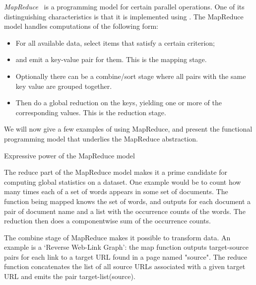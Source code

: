 
\emph{MapReduce}~\cite{Google:mapreduce} is a
programming model for certain parallel operations. One of its
distinguishing characteristics is that it is implemented using
.  The MapReduce model handles
computations of the following form:
\begin{itemize}
\item For all available data, select items that satisfy a certain
  criterion;
\item and emit a key-value pair for them. This is the mapping stage.
\item Optionally there can be a combine/sort stage where all pairs with the
  same key value are grouped together.
\item Then do a global reduction on the keys, yielding one or more of
  the corresponding values. This is the reduction stage.
\end{itemize}

We will now give a few examples of using MapReduce, and present the
functional programming model that underlies the MapReduce abstraction.

 {Expressive power of the MapReduce model}
 
The reduce part of the MapReduce model makes it a prime candidate for
computing global statistics on a dataset.
One example would be to count how many times each of a set of words
appears in some set of documents. The function being mapped knows the
set of words, and outputs for each document a pair of document name
and a list with the occurrence counts of the words. The reduction then
does a componentwise sum of the occurrence counts.

The combine stage of MapReduce makes it possible to transform data.
An example is a `Reverse Web-Link Graph': the map function
outputs target-source pairs for each link to a target URL found in
a page named "source". The reduce function concatenates the list of
all source URLs associated with a given target URL and emits the pair
target-list(source).

